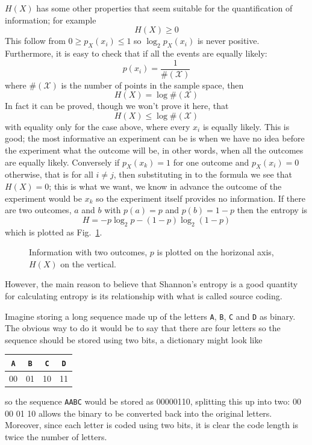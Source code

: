 \documentclass[12pt]{article}
\begin{document}
$H(X)$ has some other properties that seem suitable for the
quantification of information; for example
\begin{equation}
H(X)\ge 0
\end{equation}
This follow from $0\ge p_X(x_i)\le 1$ so $\log_2{p_X(x_i)}$ is never
positive. Furthermore, it is easy to check that if all the events are equally likely:
\begin{equation}
p(x_i)=\frac{1}{\#(\mathcal{X})}
\end{equation}
where $\#(\mathcal{X})$ is the number of points in the sample space, then
\begin{equation}
H(X)=\log{\#(\mathcal{X})}
\end{equation}
In fact it can be proved, though we won't prove it here, that
\begin{equation}
H(X)\le \log{\#(\mathcal{X})}
\end{equation}
with equality only for the case above, where every $x_i$ is equally
likely. This is good; the most informative an experiment can be is
when we have no idea before the experiment what the outcome will be,
in other words, when all the outcomes are equally likely. Conversely
if $p_X(x_k)=1$ for one outcome and $p_X(x_i)=0$ otherwise, that is for
all $i\not=j$, then substituting in to the formula we see that
$H(X)=0$; this is what we want, we know in advance the outcome of the
experiment would be $x_k$ so the experiment itself provides no
information. If there are two outcomes, $a$ and $b$ with $p(a)=p$ and
$p(b)=1-p$ then the entropy is
\begin{equation}
H=-p\log_2{p}-(1-p)\log_2{(1-p)}
\end{equation}
which is plotted as Fig.~\ref{fig_two_outcomes}.

\begin{figure}
\begin{center}

\end{center}
\caption{Information with two outcomes, $p$ is plotted on the
  horizonal axis, $H(X)$ on the vertical.\label{fig_two_outcomes}}
\end{figure}

However, the main reason to believe that Shannon's entropy is a good
quantity for calculating entropy is its relationship with what is
called source coding. 

Imagine storing a long sequence made up of the letters \texttt{A}, \texttt{B}, \texttt{C} and \texttt{D}
as binary. The obvious way to do it would be to say that there are
four letters so the sequence should be stored using two bits, a
dictionary might look like
\begin{center}
\begin{tabular}{cccc}
\texttt{A}&\texttt{B}&\texttt{C}&\texttt{D}\\
\hline
00&01&10&11
\end{tabular}
\end{center}
so the sequence \texttt{AABC} would be stored as 00000110, splitting this up
into two: 00 00 01 10 allows the binary to be converted back into the
original letters. Moreover, since each letter is coded using two bits,
it is clear the code length is twice the number of letters. 
\end{document}
